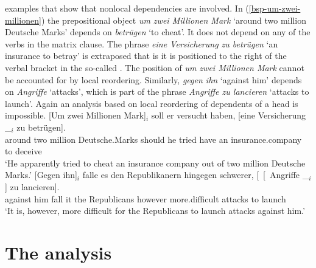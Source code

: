 examples that show that nonlocal dependencies are involved. In (\ref{bsp-um-zwei-millionen}) the
prepositional object \emph{um zwei Millionen Mark} `around two million Deutsche Marks' depends on
\emph{betrügen} `to cheat'. It does not
depend on any of the verbs in the matrix clause. The phrase \emph{eine Versicherung zu betrügen} `an
insurance to betray' is extraposed that is it is positioned to the right of the verbal bracket in the so-called \nf. The
position of \emph{um zwei Millionen Mark} cannot be accounted for by local reordering. Similarly,
\emph{gegen ihn} `against him' depends on \emph{Angriffe} `attacks', which is part of the phrase \emph{Angriffe zu
  lancieren} `attacks to launch'. Again an analysis based on local reordering of dependents of a head is impossible.
\eal
\label{bsp-Fernabhaengigkeit}
\ex\label{bsp-um-zwei-millionen}
\gll {}[Um zwei Millionen Mark]$_i$ soll er versucht haben, [eine Versicherung \_$_i$ zu betrügen].\footnotemark\\
       \spacebr{}around two million Deutsche.Marks should he tried have \spacebr{}an insurance.company {} to deceive\\\german
{}
\glt `He apparently tried to cheat an insurance company out of two million Deutsche Marks.'
\ex
\gll {}[Gegen ihn]$_i$ falle es den Republikanern hingegen schwerer, [~[~Angriffe \_$_i$] zu lancieren].\footnotemark\\
	 {}\spacebr{}against him fall it the Republicans however more.difficult \hphantom{[~[~}attacks {} to launch\\
\glt `It is, however, more difficult for the Republicans to launch attacks against him.'
\zl



\section{The analysis}
\label{sec-analysis-verb-mevement}

